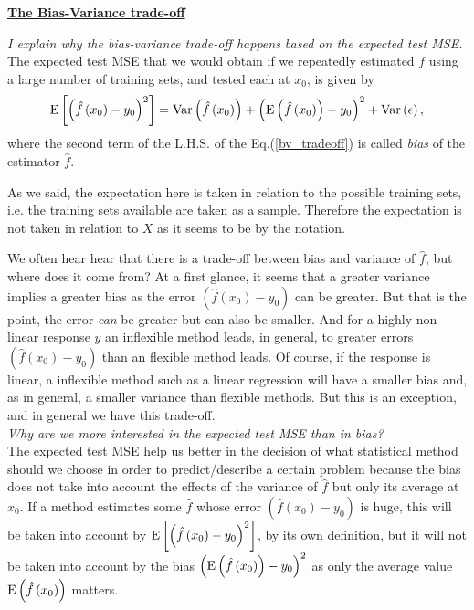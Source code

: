 \documentclass[aps,12pt,nofootinbib,prd]{revtex4-2}
\begin{document}
\pagestyle{empty}
\centerline{{\Large \bf \underline{The Bias-Variance trade-off}}}
\vspace{.5cm}
\noindent
{\it I explain why the bias-variance trade-off happens based on the expected test MSE.}\\[0.3cm]
\noindent
 The expected test MSE that we would obtain if we repeatedly estimated $f$ using a large number of training sets, and tested each at $x_0$, is given by
 \begin{equation}\label{bv_tradeoff}
  {\rm E}\left[\left(\hat{f}\left(x_0\right) - y_0 \right)^2\right] = {\rm Var}\left(\hat{f}\left(x_0\right)\right) + \left({\rm E}\left(\hat{f}\left(x_0\right)\right) - y_0\right)^2 + {\rm Var}\left(\epsilon\right),
 \end{equation}
where the second term of the L.H.S. of the Eq.(\ref{bv_tradeoff}) is called {\it bias} of the estimator $\hat{f}$.

\noindent
As we said, the expectation here is taken in relation to the possible training sets, i.e. the training sets available are taken as a sample. Therefore the expectation is not taken in relation to $X$ as it seems to be by the notation.

\noindent
We often hear hear that there is a trade-off between bias and variance of $\hat{f}$, but where does it come from? At a first glance, it seems that a greater variance implies a greater bias as the error $\left(\hat{f}\left(x_0\right) - y_0\right)$ can be greater. But that is the point, the error {\it can} be greater but can also be smaller. And for a highly non-linear response $y$ an inflexible method leads, in general, to greater errors $\left(\hat{f}\left(x_0\right) - y_0\right)$ than an flexible method leads. Of course, if the response is linear, a inflexible method such as a linear regression will have a smaller bias and, as in general, a smaller variance than flexible methods. But this is an exception, and in general we have this trade-off.\\[0.3cm]
{\it Why are we more interested in the expected test MSE than in bias?}\\[0.3cm] 
The expected test MSE help us better in the decision of what statistical method should we choose in order to predict/describe a certain problem because the bias does not take into account the effects of the variance of $\hat{f}$ but only its average at $x_0$. If a method estimates some $\hat{f}$ whose error $\left(\hat{f}\left(x_0\right) - y_0\right)$ is huge, this will be taken into account by ${\rm E}\left[\left(\hat{f}\left(x_0\right) - y_0 \right)^2\right]$, by its own definition, but it will not be taken into account by the bias 
$\left({\rm E}\left(\hat{f}\left(x_0\right)\right) - y_0\right)^2$ as only the average value 
${\rm E}\left(\hat{f}\left(x_0\right)\right)$ matters.
\end{document}

